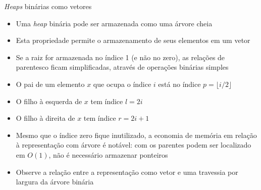 \begin{frame}[fragile]{\textit{Heaps} binárias como vetores}

    \begin{itemize}
        \item Uma \textit{heap} binária pode ser armazenada como uma árvore cheia

        \item Esta propriedade permite o armazenamento de seus elementos em um vetor

        \item Se a raiz for armazenada no índice 1 (e não no zero), as relações de parentesco
            ficam simplificadas, através de operações binárias simples

        \item O pai de um elemento $x$ que ocupa o índice $i$ está no índice $p = \lfloor i/2\rfloor$

        \item O filho à esquerda de $x$ tem índice $l = 2i$
        \item O filho à direita  de $x$ tem índice $r = 2i + 1$

        \item Mesmo que o índice zero fique inutilizado, a economia de memória em relação à 
            representação com árvore é notável: com os parentes podem ser localizado em $O(1)$,
            não é necessário armazenar ponteiros

        \item Observe a relação entre a representação como vetor e uma travessia por largura
            da árvore binária
    \end{itemize}

\end{frame}

